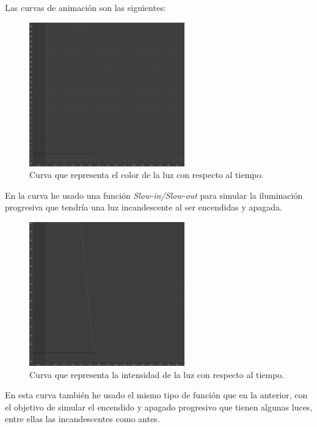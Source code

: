 \newpage

Las curvas de animación son las siguientes:

\begin{figure}[H]
    \centering
    \includegraphics[width=0.6\textwidth]{imagenes/curvas/LL/filter.png}
    \caption{Curva que representa el color de la luz con respecto al tiempo.}
 \end{figure}

En la curva he usado una función \textit{Slow-in/Slow-out} para simular la iluminación progresiva que tendría una luz incandescente al ser encendidas y apagada.

 \begin{figure}[H]
    \centering
    \includegraphics[width=0.6\textwidth]{imagenes/curvas/LL/intensity.png}
    \caption{Curva que representa la intensidad de la luz con respecto al tiempo.}
 \end{figure}

 En esta curva también he usado el mismo tipo de función que en la anterior, con el objetivo de simular el encendido y apagado progresivo que tienen algunas luces, entre ellas las incandescentes como antes.

